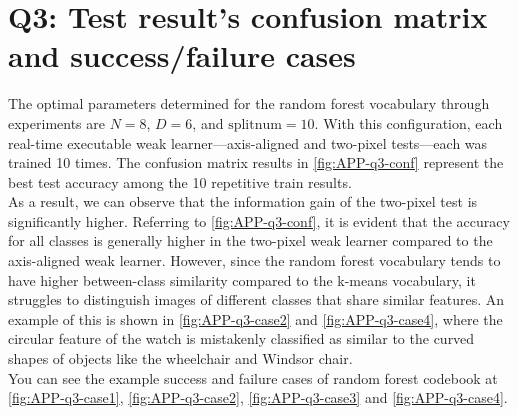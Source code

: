 \section{Q3: Test result's confusion matrix and success/failure cases}
\label{subsec:Q3-app4}
The optimal parameters determined for the random forest vocabulary through experiments are $N=8$, $D=6$, and $\text{splitnum}=10$. With this configuration, each real-time executable weak learner—axis-aligned and two-pixel tests—each was trained 10 times. The confusion matrix results in \cref{fig:APP-q3-conf} represent the best test accuracy among the 10 repetitive train results.\\
As a result, we can observe that the information gain of the two-pixel test is significantly higher. Referring to \cref{fig:APP-q3-conf}, it is evident that the accuracy for all classes is generally higher in the two-pixel weak learner compared to the axis-aligned weak learner. However, since the random forest vocabulary tends to have higher between-class similarity compared to the k-means vocabulary, it struggles to distinguish images of different classes that share similar features. An example of this is shown in \cref{fig:APP-q3-case2} and \cref{fig:APP-q3-case4}, where the circular feature of the watch is mistakenly classified as similar to the curved shapes of objects like the wheelchair and Windsor chair.\\
You can see the example success and failure cases of random forest codebook at \cref{fig:APP-q3-case1}, \cref{fig:APP-q3-case2}, \cref{fig:APP-q3-case3} and \cref{fig:APP-q3-case4}.

